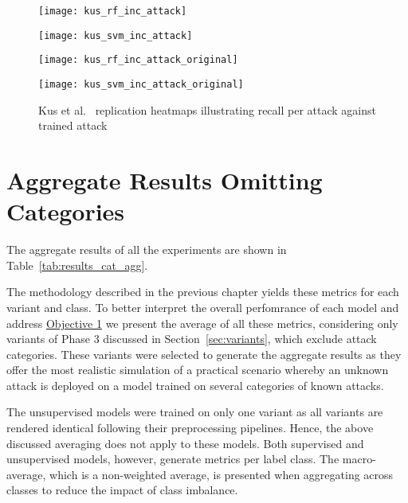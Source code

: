 \begin{figure}[htbp]
    \centering
    \begin{minipage}[h]{0.5\textwidth}
        \centering
        \texttt{[image: kus\_rf\_inc\_attack]}
    \end{minipage}\hfill
    \begin{minipage}[h]{0.5\textwidth}
        \centering
        \texttt{[image: kus\_svm\_inc\_attack]}
    \end{minipage}    
    \begin{minipage}[h]{0.5\textwidth}
        \centering
        \texttt{[image: kus\_rf\_inc\_attack\_original]}
    \end{minipage}\hfill
    \begin{minipage}[h]{0.5\textwidth}
        \centering
        \texttt{[image: kus\_svm\_inc\_attack\_original]}
    \end{minipage}
    \caption[Kus et al.~\cite{Kus} Replication Single Attack Heatmaps]{Kus et al.~\cite{Kus} replication heatmaps illustrating recall per attack against trained attack\label{fig:kus_rep_inc_att}}
\end{figure}
% 

\section{Aggregate Results Omitting Categories}%
\label{sec:agg_res_cat}


The aggregate results of all the experiments are shown in
Table~\ref{tab:results_cat_agg}.

The methodology described in the previous chapter yields these metrics for each
variant and class. To better interpret the overall perfomrance of each model
and address \hyperlink{obj}{Objective 1} we present the average of all these
metrics, considering only variants of Phase 3 discussed in
Section~\ref{sec:variants}, which exclude attack categories. These variants
were selected to generate the aggregate results as they offer the most
realistic simulation of a practical scenario whereby an unknown attack is
deployed on a model trained on several categories of known attacks.

The unsupervised models were trained on only one variant as all variants are
rendered identical following their preprocessing pipelines. Hence, the above
discussed averaging does not apply to these models. Both supervised and
unsupervised models, however, generate metrics per label class. The
macro-average, which is a non-weighted average, is presented when aggregating
across classes to reduce the impact of class imbalance.

